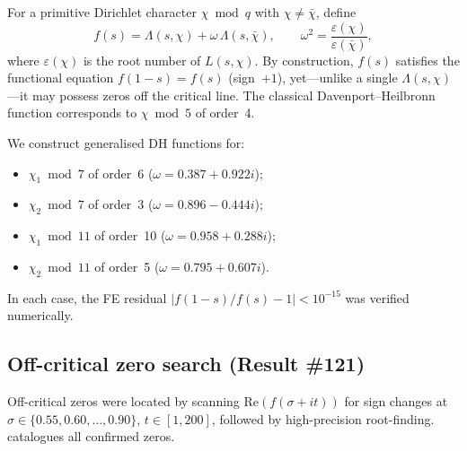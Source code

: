 \documentclass[11pt, a4paper]{article}
\theoremstyle{plain}
\theoremstyle{definition}
\newcommand{\abs}[1]{\left|#1\right|}
\newcommand{\Lam}{\Lambda}             %
\begin{document}
For a primitive Dirichlet character $\chi \bmod q$ with
$\chi \neq \bar{\chi}$, define
\begin{equation}\label{eq:dh-general}
  f(s) = \Lam(s,\chi) + \omega\,\Lam(s,\bar{\chi}),
  \qquad \omega^{2} = \frac{\varepsilon(\chi)}{\varepsilon(\bar{\chi})},
\end{equation}
where $\varepsilon(\chi)$ is the root number of $L(s,\chi)$.  By
construction, $f(s)$ satisfies the functional equation
$f(1-s) = f(s)$ (sign~$+1$), yet---unlike a single
$\Lam(s,\chi)$---it may possess zeros off the critical line.  The
classical Davenport--Heilbronn function corresponds to $\chi \bmod 5$
of order~4.

We construct generalised DH functions for:
\begin{itemize}
  \item $\chi_{1} \bmod 7$ of order~6 ($\omega = 0.387 + 0.922i$);
  \item $\chi_{2} \bmod 7$ of order~3 ($\omega = 0.896 - 0.444i$);
  \item $\chi_{1} \bmod 11$ of order~10 ($\omega = 0.958 + 0.288i$);
  \item $\chi_{2} \bmod 11$ of order~5 ($\omega = 0.795 + 0.607i$).
\end{itemize}
In each case, the FE residual
$\abs{f(1-s)/f(s) - 1} < 10^{-15}$ was verified numerically.


\subsection{Off-critical zero search (Result \#121)}
\label{sec:dh-zeros}

Off-critical zeros were located by scanning
$\mathrm{Re}(f(\sigma+it))$ for sign changes at $\sigma \in
\{0.55, 0.60, \ldots, 0.90\}$, $t \in [1, 200]$, followed by
high-precision root-finding.   catalogues all
confirmed zeros.
\end{document}
